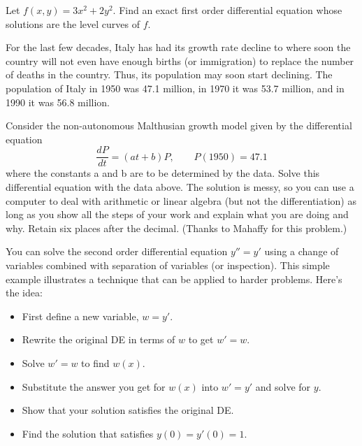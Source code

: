 \documentclass[12pt,letterpaper]{hmcpset}
\begin{document}
\begin{solution}
    \vfill
\end{solution}
\clearpage

\begin{problem}[B5]
    Let $f(x, y) = 3x^2 + 2y^2$. Find an exact first
    order differential equation whose solutions are 
    the level curves of $f$.
\end{problem}

\begin{solution}
    \vfill
\end{solution}
\clearpage

\begin{problem}[B6]
    For the last few decades, Italy has had its growth
    rate decline to where soon the country will not even 
    have enough births (or immigration) to replace the
    number of deaths in the country. Thus, its population
    may soon start declining. The population of Italy in
    1950 was 47.1 million, in 1970 it was 53.7 million, and 
    in 1990 it was 56.8 million. 
    
    Consider the non-autonomous Malthusian growth model
    given by the differential equation
    \[
        \frac{dP}{dt} = (at+b)P, \qquad P(1950) = 47.1
    \]
    where the constants a and b are to be determined by the 
    data. Solve this differential equation with the data 
    above. The solution is messy, so you can use a computer
    to deal with arithmetic or linear algebra (but not the 
    differentiation) as long as you show all the steps of 
    your work and explain what you are doing and why. Retain 
    six places after the decimal. (Thanks to Mahaffy for 
    this problem.)
\end{problem}

\begin{solution}
    \vfill
\end{solution}
\clearpage

\begin{problem}[B7]
    You can solve the second order differential equation
    $y'' = y'$ using a change of variables combined with
    separation of variables (or inspection). This simple
    example illustrates a technique that can be applied
    to harder problems. Here’s the idea:
    \begin{itemize}
        \item First define a new variable, $w = y'$.
        \item Rewrite the original DE in terms of $w$ to get $w' = w$.
        \item Solve $w' = w$ to find $w(x)$.
        \item Substitute the answer you get for $w(x)$
            into $w' = y'$ and solve for $y$.
        \item Show that your solution satisfies the original DE.
        \item Find the solution that satisfies $y(0) = y'(0) = 1$.
    \end{itemize}
\end{problem}
\end{document}
